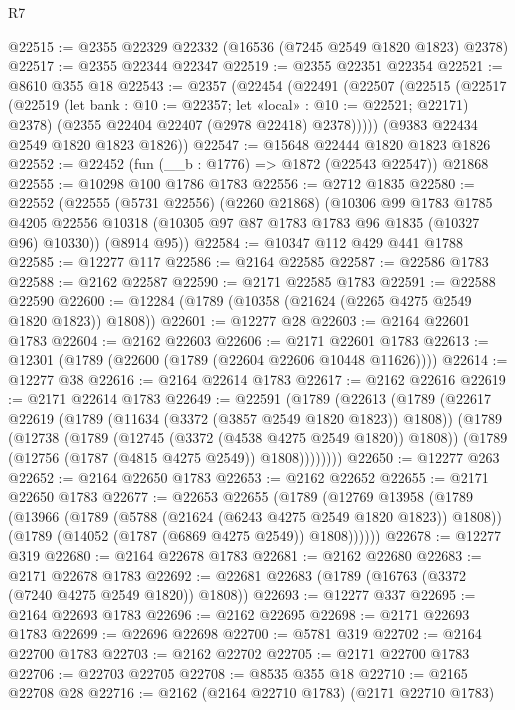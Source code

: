 \begin{lexlean}{R7}
\begin{coremodule}
@22515 := @2355 @22329 @22332 (@16536 (@7245 @2549 @1820 @1823) @2378)
@22517 := @2355 @22344 @22347
@22519 := @2355 @22351 @22354
@22521 := @8610 @355 @18
@22543 := @2357
    (@22454
      (@22491
        (@22507
          (@22515
            (@22517
              (@22519 (let bank : @10 := @22357; let «local» : @10 := @22521; @22171) @2378)
              (@2355 @22404 @22407 (@2978 @22418) @2378)))))
      (@9383 @22434 @2549 @1820 @1823 @1826))
@22547 := @15648 @22444 @1820 @1823 @1826
@22552 := @22452 (fun (__b : @1776) => @1872 (@22543 @22547)) @21868
@22555 := @10298 @100 @1786 @1783
@22556 := @2712 @1835
@22580 := @22552
    (@22555
      (@5731 @22556)
      (@2260 @21868)
      (@10306
        @99
        @1783
        @1785
        @4205
        @22556
        @10318
        (@10305 @97 @87 @1783 @1783 @96 @1835 (@10327 @96) @10330))
      (@8914 @95))
@22584 := @10347 @112 @429 @441 @1788
@22585 := @12277 @117
@22586 := @2164 @22585
@22587 := @22586 @1783
@22588 := @2162 @22587
@22590 := @2171 @22585 @1783
@22591 := @22588 @22590
@22600 := @12284 (@1789 (@10358 (@21624 (@2265 @4275 @2549 @1820 @1823)) @1808))
@22601 := @12277 @28
@22603 := @2164 @22601 @1783
@22604 := @2162 @22603
@22606 := @2171 @22601 @1783
@22613 := @12301 (@1789 (@22600 (@1789 (@22604 @22606 @10448 @11626))))
@22614 := @12277 @38
@22616 := @2164 @22614 @1783
@22617 := @2162 @22616
@22619 := @2171 @22614 @1783
@22649 := @22591
    (@1789
      (@22613
        (@1789
          (@22617
            @22619
            (@1789 (@11634 (@3372 (@3857 @2549 @1820 @1823)) @1808))
            (@1789
              (@12738
                (@1789 (@12745 (@3372 (@4538 @4275 @2549 @1820)) @1808))
                (@1789 (@12756 (@1787 (@4815 @4275 @2549)) @1808))))))))
@22650 := @12277 @263
@22652 := @2164 @22650 @1783
@22653 := @2162 @22652
@22655 := @2171 @22650 @1783
@22677 := @22653
    @22655
    (@1789
      (@12769
        @13958
        (@1789
          (@13966
            (@1789 (@5788 (@21624 (@6243 @4275 @2549 @1820 @1823)) @1808))
            (@1789 (@14052 (@1787 (@6869 @4275 @2549)) @1808))))))
@22678 := @12277 @319
@22680 := @2164 @22678 @1783
@22681 := @2162 @22680
@22683 := @2171 @22678 @1783
@22692 := @22681 @22683 (@1789 (@16763 (@3372 (@7240 @4275 @2549 @1820)) @1808))
@22693 := @12277 @337
@22695 := @2164 @22693 @1783
@22696 := @2162 @22695
@22698 := @2171 @22693 @1783
@22699 := @22696 @22698
@22700 := @5781 @319
@22702 := @2164 @22700 @1783
@22703 := @2162 @22702
@22705 := @2171 @22700 @1783
@22706 := @22703 @22705
@22708 := @8535 @355 @18
@22710 := @2165 @22708 @28
@22716 := @2162 (@2164 @22710 @1783) (@2171 @22710 @1783)

\end{coremodule}
\end{lexlean}
